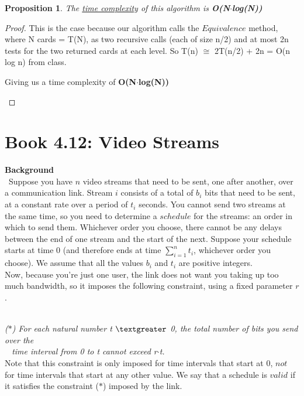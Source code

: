 \documentclass[12pt]{article}
\newtheorem{proposition}[theorem]{Proposition}
\begin{document}
\begin{proposition}
\label{numq}
The \underline{time complexity} of this algorithm is \textbf{O(N$\cdot$log(N))}
\end{proposition}

\begin{proof}
This is the case because our algorithm calls the $Equivalence$ method,
where N cards = T(N), as two recursive calls (each of size n/2) and
at most 2n tests for the two returned cards at each level. So T(n)
$\cong$ 2T(n/2) + 2n = O(n log n) from class.
\begin{center}
    Giving us a time complexity of \textbf{O(N$\cdot$log(N))}
\end{center}
\end{proof}

\newpage

\section{Book 4.12: Video Streams}
\textbf{Background} \\
~\indent Suppose you have $n$ video streams that need to be sent,
one after another, over a communication link. Stream $i$ consists
of a total of $b_i$ bits that need to be sent, at a constant rate
over a period of $t_i$ seconds. You cannot send two streams at the
same time, so you need to determine a $schedule$ for the streams:
an order in which to send them. Whichever order you choose, there
cannot be any delays between the end of one stream and the start
of the next. Suppose your schedule starts at time 0 (and therefore
ends at time $\sum_{i=1}^{n} t_i$, whichever order you choose). We
assume that all the values $b_i$ and $t_i$ are positive integers. \\
\indent Now, because you're just one user, the link does not want
you taking up too much bandwidth, so it imposes the following
constraint, using a fixed parameter $r$.

~ \\ \indent \textit{($\ast$) For each natural number t
$\textgreater$ 0, the total number of bits you send over the \\
~ \indent time interval from 0 to t cannot exceed r$\cdot$t.} \\

Note that this constraint is only imposed for time intervals that
start at 0, $not$ for time intervals that start at any other value.
We say that a schedule is $valid$ if it satisfies the constraint
($\ast$) imposed by the link. \\
\end{document}

